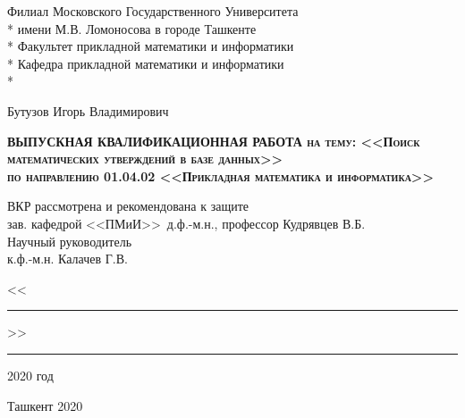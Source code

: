 \documentclass[12pt]{article}
\begin{document}
\thispagestyle{empty}

\begin{titlepage}

    \begin{center}
    Филиал Московского Государственного Университета \\*
    имени М.В. Ломоносова в городе Ташкенте\\*
    Факультет прикладной математики и информатики\\*
    Кафедра прикладной математики и информатики\\*
    \hrulefill
    \end{center}

    \vspace{2em}

 \begin{center}
    \Large Бутузов Игорь Владимирович
    \end{center}

    \vspace{4.5em}


\begin{center}
    \textsc{\textbf{ВЫПУСКНАЯ КВАЛИФИКАЦИОННАЯ РАБОТА \vskip 1cm  на тему: <<Поиск математических утверждений в базе данных>>\\ по направлению 01.04.02  <<Прикладная математика и информатика>>}}
    
    \end{center}

  \vspace{3.5em}

 \begin{flushleft}
    ВКР рассмотрена и рекомендована к защите\\
    зав. кафедрой <<ПМиИ>>\, д.ф.-м.н., профессор \hrulefill Кудрявцев В.Б.\\
    \vspace{1.5em}
    Научный руководитель \\
    к.ф.-м.н. \hrulefill Калачев Г.В.
    \end{flushleft}

    \begin{flushleft}
    \raggedleft <<\rule{1cm}{0.5pt}>> \rule{2.5cm}{0.5pt} 2020 год
    \end{flushleft}

    \vspace{\fill}

    \begin{center}
    Ташкент 2020
    \end{center}
    
\end{titlepage}
\end{document}
